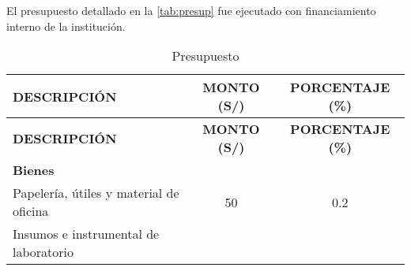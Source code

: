 \documentclass[a4paper]{article}
\begin{document}
El presupuesto detallado en la \autoref{tab:presup} fue ejecutado con
financiamiento interno de la institución.

\begin{longtable}[]{@{}lcc@{}}
\caption{Presupuesto \label{tab:presup}}\tabularnewline
\toprule
\begin{minipage}[b]{0.44\columnwidth}\raggedright\strut
\textbf{DESCRIPCIÓN}\strut
\end{minipage} & \begin{minipage}[b]{0.23\columnwidth}\centering\strut
\textbf{MONTO (S/)}\strut
\end{minipage} & \begin{minipage}[b]{0.23\columnwidth}\centering\strut
\textbf{PORCENTAJE (\%)}\strut
\end{minipage}\tabularnewline
\midrule
\endfirsthead
\toprule
\begin{minipage}[b]{0.44\columnwidth}\raggedright\strut
\textbf{DESCRIPCIÓN}\strut
\end{minipage} & \begin{minipage}[b]{0.23\columnwidth}\centering\strut
\textbf{MONTO (S/)}\strut
\end{minipage} & \begin{minipage}[b]{0.23\columnwidth}\centering\strut
\textbf{PORCENTAJE (\%)}\strut
\end{minipage}\tabularnewline
\midrule
\endhead
\begin{minipage}[t]{0.44\columnwidth}\raggedright\strut
\textbf{Bienes}\strut
\end{minipage} & \begin{minipage}[t]{0.23\columnwidth}\centering\strut
\strut
\end{minipage} & \begin{minipage}[t]{0.23\columnwidth}\centering\strut
\strut
\end{minipage}\tabularnewline
\begin{minipage}[t]{0.44\columnwidth}\raggedright\strut
Papelería, útiles y material de oficina\strut
\end{minipage} & \begin{minipage}[t]{0.23\columnwidth}\centering\strut
50\strut
\end{minipage} & \begin{minipage}[t]{0.23\columnwidth}\centering\strut
0.2\strut
\end{minipage}\tabularnewline
\begin{minipage}[t]{0.44\columnwidth}\raggedright\strut
Insumos e instrumental de laboratorio\strut

\end{minipage}
\end{longtable}
\end{document}
